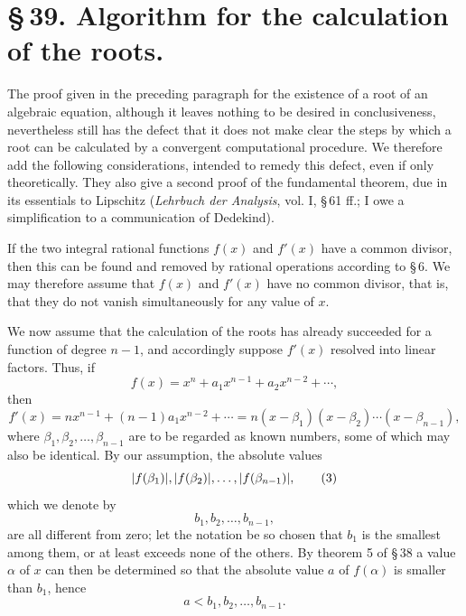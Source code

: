 \documentclass[11pt]{article}
\begin{document}
\section*{\S\,39. Algorithm for the calculation of the roots.}

The proof given in the preceding paragraph for the existence of a root of an algebraic equation, although it leaves nothing to be desired in conclusiveness, nevertheless still has the defect that it does not make clear the steps by which a root can be calculated by a convergent computational procedure. We therefore add the following considerations, intended to remedy this defect, even if only theoretically. They also give a second proof of the fundamental theorem, due in its essentials to Lipschitz (\emph{Lehrbuch der Analysis}, vol. I, \S\,61 ff.; I owe a simplification to a communication of Dedekind).

If the two integral rational functions $f(x)$ and $f'(x)$ have a common divisor, then this can be found and removed by rational operations according to \S\,6. We may therefore assume that $f(x)$ and $f'(x)$ have no common divisor, that is, that they do not vanish simultaneously for any value of $x$.

We now assume that the calculation of the roots has already succeeded for a function of degree $n-1$, and accordingly suppose $f'(x)$ resolved into linear factors. Thus, if
\begin{equation}
 f(x)=x^n+a_1x^{n-1}+a_2x^{n-2}+\cdots,
\tag{1}
\end{equation}
then
\begin{equation}
 f'(x)=nx^{n-1}+(n-1)a_1x^{n-2}+\cdots
      =n(x-\beta_1)(x-\beta_2)\cdots(x-\beta_{n-1}),
\tag{2}
\end{equation}
where $\beta_1,\beta_2,\ldots,\beta_{n-1}$ are to be regarded as known numbers, some of which may also be identical. By our assumption, the absolute values
\begin{equation}
 |f(\beta_1)|,\\ |f(\beta_2)|,\ldots, |f(\beta_{n-1})|,
\tag{3}
\end{equation}
which we denote by
\begin{equation}
 b_1,b_2,\ldots,b_{n-1},
\tag{4}
\end{equation}
are all different from zero; let the notation be so chosen that $b_1$ is the smallest among them, or at least exceeds none of the others. By theorem 5 of \S\,38 a value $\alpha$ of $x$ can then be determined so that the absolute value $a$ of $f(\alpha)$ is smaller than $b_1$, hence
\begin{equation}
 a<b_1,b_2,\ldots,b_{n-1}.
\tag{5}
\end{equation}
\end{document}
